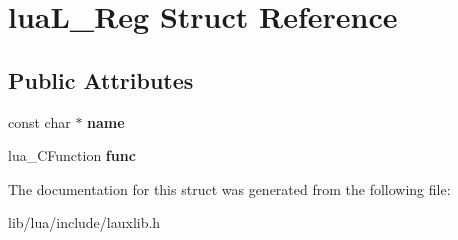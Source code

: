 \hypertarget{structlua_l___reg}{}\section{lua\+L\+\_\+\+Reg Struct Reference}
\label{structlua_l___reg}
\subsection*{Public Attributes}
\begin{DoxyCompactItemize}
\item 
\hypertarget{structlua_l___reg_a58b99f63b304e5c489b90d812f92cba2}{}const char $\ast$ {\bfseries name}\label{structlua_l___reg_a58b99f63b304e5c489b90d812f92cba2}

\item 
\hypertarget{structlua_l___reg_a54aa8f9955870caf78148514e61196ce}{}lua\+\_\+\+C\+Function {\bfseries func}\label{structlua_l___reg_a54aa8f9955870caf78148514e61196ce}

\end{DoxyCompactItemize}


The documentation for this struct was generated from the following file\+:\begin{DoxyCompactItemize}
\item 
lib/lua/include/lauxlib.\+h\end{DoxyCompactItemize}
